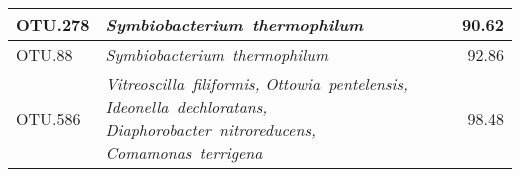 \begin{table}[H]
{\begin{longtable}{l>{\itshape}p{14cm}r}
OTU.278 & Symbiobacterium~thermophilum & 90.62 \\ \midrule
OTU.88 & Symbiobacterium~thermophilum & 92.86 \\ \midrule
OTU.586 & Vitreoscilla~filiformis, Ottowia~pentelensis, Ideonella~dechloratans, Diaphorobacter~nitroreducens, Comamonas~terrigena & 98.48 \\ \midrule

    \bottomrule
\end{longtable}}{}
\end{table}
